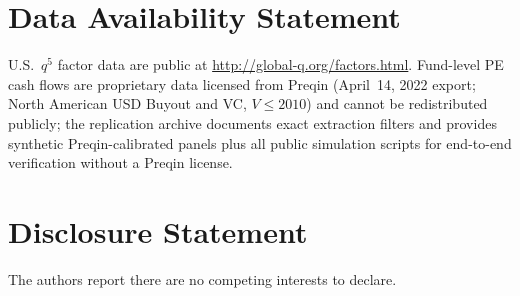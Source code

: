 \documentclass[12pt]{article}
\begin{document}
\section*{Data Availability Statement}

\noindent U.S.\ $q^5$ factor data are public at \url{http://global-q.org/factors.html}. Fund-level PE cash flows are proprietary data licensed from Preqin (April~14, 2022 export; North American USD Buyout and VC, $V \le 2010$) and cannot be redistributed publicly; the replication archive documents exact extraction filters and provides synthetic Preqin-calibrated panels plus all public simulation scripts for end-to-end verification without a Preqin license.

\section*{Disclosure Statement}

\noindent The authors report there are no competing interests to declare.

\vspace{0.6em}
\setlength{\bibsep}{1pt plus 0.2ex}


\end{document}
